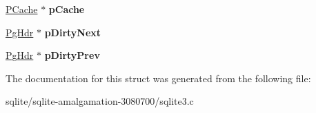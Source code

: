 \begin{DoxyCompactItemize}
\item 
\hypertarget{struct_pg_hdr_a557aeaddd1b0805815ce06f1bfd27782}{\hyperlink{struct_p_cache}{P\+Cache} $\ast$ {\bfseries p\+Cache}}\label{struct_pg_hdr_a557aeaddd1b0805815ce06f1bfd27782}

\item 
\hypertarget{struct_pg_hdr_a61b56eb694ce445799963f7eb912e367}{\hyperlink{struct_pg_hdr}{Pg\+Hdr} $\ast$ {\bfseries p\+Dirty\+Next}}\label{struct_pg_hdr_a61b56eb694ce445799963f7eb912e367}

\item 
\hypertarget{struct_pg_hdr_a8392b45bb05d88c734020beb912304dc}{\hyperlink{struct_pg_hdr}{Pg\+Hdr} $\ast$ {\bfseries p\+Dirty\+Prev}}\label{struct_pg_hdr_a8392b45bb05d88c734020beb912304dc}

\end{DoxyCompactItemize}


The documentation for this struct was generated from the following file\+:\begin{DoxyCompactItemize}
\item 
sqlite/sqlite-\/amalgamation-\/3080700/sqlite3.\+c\end{DoxyCompactItemize}
